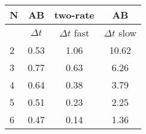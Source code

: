 \begin{tabular}{l|c|cc}
N & AB & two-rate& AB\\
\hline
 & $\Delta t$ & $\Delta t$ fast & $\Delta t$ slow\\
\hline
2 & 0.53& 1.06 & 10.62 \\
\hline
3 & 0.77& 0.63 & 6.26 \\
\hline
4 & 0.64& 0.38 & 3.79 \\
\hline
5 & 0.51& 0.23 & 2.25 \\
\hline
6 & 0.47& 0.14 & 1.36 \\
\hline
\end{tabular}
